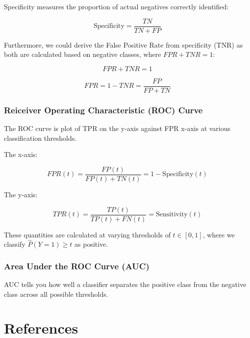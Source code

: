 \documentclass[
]{article}
\begin{document}
Specificity measures the proportion of actual negatives correctly identified:

\[\text{Specificity} = \frac{TN}{TN + FP}\]

Furthermore, we could derive the False Positive Rate from specificity (TNR) as both are calculated based on negative classes, where \(FPR + TNR = 1\):

\[FPR + TNR  = 1\]

\[FPR = 1 - TNR = \frac{FP}{FP + TN}\]

\hypertarget{reiceiver-operating-characteristic-roc-curve}{%
\subsubsection{Reiceiver Operating Characteristic (ROC) Curve}\label{reiceiver-operating-characteristic-roc-curve}}

The ROC curve is plot of TPR on the y-axis against FPR x-axis at various classification thresholds.

The x-axis:

\[FPR(t) = \frac{FP(t)}{FP(t) + TN(t)} = 1 - \text{Specificity}(t)\]

The y-axis:

\[TPR(t) = \frac{TP(t)}{TP(t) + FN(t)} = \text{Sensitivity}(t)\]

These quantities are calculated at varying thresholds of \(t \in [0, 1]\), where we classify \(\hat{P}(Y=1) \geq t\) as positive.

\hypertarget{area-under-the-roc-curve-auc}{%
\subsubsection{Area Under the ROC Curve (AUC)}\label{area-under-the-roc-curve-auc}}

AUC tells you how well a classifier separates the positive class from the negative class across all possible thresholds.

\newpage

\hypertarget{references}{%
\section{References}\label{references}}
\end{document}
